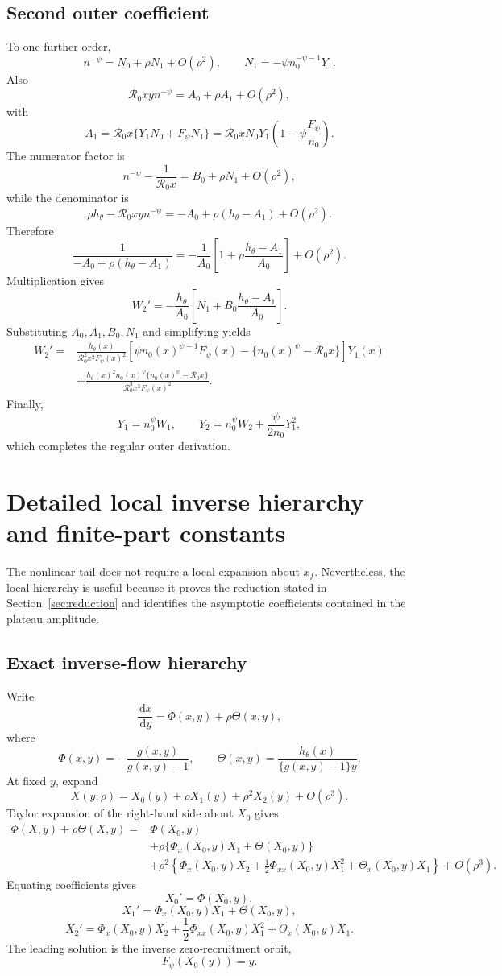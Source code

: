 \documentclass[11pt]{article}
\newcommand{\Rzero}{\mathcal R_0}
\newcommand{\hth}{h_\theta}
\newcommand{\Fpsi}{F_\psi}
\newcommand{\xf}{x_f}
\newcommand{\dd}{\,\mathrm{d}}
\begin{document}
\subsection{Second outer coefficient}
To one further order,
\[
n^{-\psi}=N_0+\rho N_1+O(\rho^2),
\qquad
N_1=-\psi n_0^{-\psi-1}Y_1.
\]
Also
\[
\Rzero xy n^{-\psi}
=A_0+\rho A_1+O(\rho^2),
\]
with
\[
A_1
=\Rzero x\{Y_1N_0+\Fpsi N_1\}
=\Rzero xN_0Y_1
\left(1-\psi\frac{\Fpsi}{n_0}\right).
\]
The numerator factor is
\[
n^{-\psi}-\frac1{\Rzero x}
=B_0+\rho N_1+O(\rho^2),
\]
while the denominator is
\[
\rho\hth-\Rzero xy n^{-\psi}
=-A_0+\rho(\hth-A_1)+O(\rho^2).
\]
Therefore
\[
\frac1{-A_0+\rho(\hth-A_1)}
=-\frac1{A_0}
\left[1+\rho\frac{\hth-A_1}{A_0}\right]
+O(\rho^2).
\]
Multiplication gives
\[
W_2'
=-\frac{\hth}{A_0}
\left[
N_1+B_0\frac{\hth-A_1}{A_0}
\right].
\]
Substituting $A_0,A_1,B_0,N_1$ and simplifying yields
\[
\boxed{
\begin{aligned}
W_2'={}&
\frac{\hth(x)}{\Rzero^2x^2\Fpsi(x)^2}
\left[
\psi n_0(x)^{\psi-1}\Fpsi(x)
-\{n_0(x)^\psi-\Rzero x\}
\right]Y_1(x)\\
&+\frac{\hth(x)^2n_0(x)^\psi\{n_0(x)^\psi-\Rzero x\}}
{\Rzero^3x^3\Fpsi(x)^2}.
\end{aligned}
}
\]
Finally,
\[
Y_1=n_0^\psi W_1,
\qquad
Y_2=n_0^\psi W_2+\frac\psi{2n_0}Y_1^2,
\]
which completes the regular outer derivation.

\section{Detailed local inverse hierarchy and finite-part constants}
\label{sec:localdetail}

The nonlinear tail does not require a local expansion about $\xf$. Nevertheless, the local hierarchy is useful because it proves the reduction stated in Section~\ref{sec:reduction} and identifies the asymptotic coefficients contained in the plateau amplitude.

\subsection{Exact inverse-flow hierarchy}
Write
\[
\frac{\dd x}{\dd y}
=\Phi(x,y)+\rho\Theta(x,y),
\]
where
\[
\Phi(x,y)=-\frac{g(x,y)}{g(x,y)-1},
\qquad
\Theta(x,y)=\frac{\hth(x)}{\{g(x,y)-1\}y}.
\]
At fixed $y$, expand
\[
X(y;\rho)=X_0(y)+\rho X_1(y)+\rho^2X_2(y)+O(\rho^3).
\]
Taylor expansion of the right-hand side about $X_0$ gives
\[
\begin{aligned}
\Phi(X,y)+\rho\Theta(X,y)
={}&\Phi(X_0,y)\\
&+\rho\{\Phi_x(X_0,y)X_1+\Theta(X_0,y)\}\\
&+\rho^2\left\{
\Phi_x(X_0,y)X_2
+\frac12\Phi_{xx}(X_0,y)X_1^2
+\Theta_x(X_0,y)X_1
\right\}
+O(\rho^3).
\end{aligned}
\]
Equating coefficients gives
\[
\boxed{X_0'=\Phi(X_0,y),}
\]
\[
\boxed{X_1'=\Phi_x(X_0,y)X_1+\Theta(X_0,y),}
\]
\[
\boxed{
X_2'=\Phi_x(X_0,y)X_2
+\frac12\Phi_{xx}(X_0,y)X_1^2
+\Theta_x(X_0,y)X_1.
}
\]
The leading solution is the inverse zero-recruitment orbit,
\[
\Fpsi(X_0(y))=y.
\]
\end{document}
